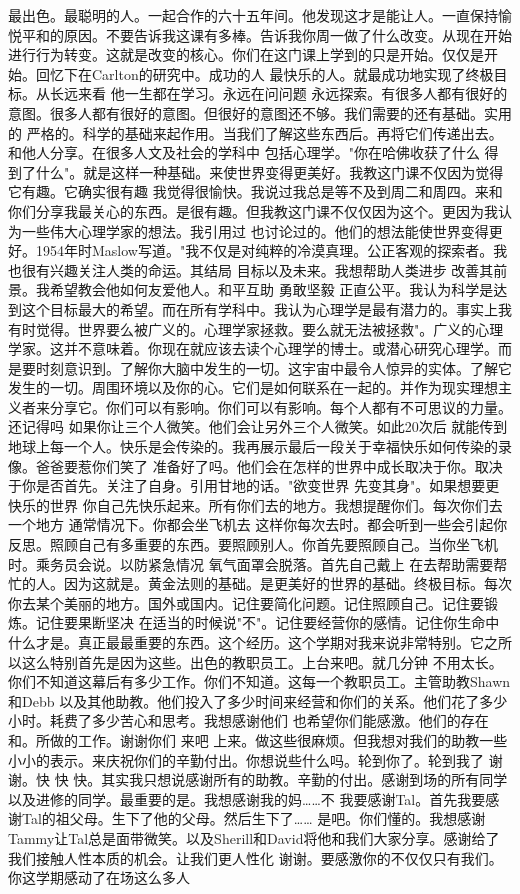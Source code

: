 最出色。最聪明的人。一起合作的六十五年间。他发现这才是能让人。一直保持愉悦平和的原因。不要告诉我这课有多棒。告诉我你周一做了什么改变。从现在开始进行行为转变。这就是改变的核心。你们在这门课上学到的只是开始。仅仅是开始。回忆下在Carlton的研究中。成功的人 最快乐的人。就最成功地实现了终极目标。从长远来看 他一生都在学习。永远在问问题 永远探索。有很多人都有很好的意图。很多人都有很好的意图。但很好的意图还不够。我们需要的还有基础。实用的 严格的。科学的基础来起作用。当我们了解这些东西后。再将它们传递出去。和他人分享。在很多人文及社会的学科中 包括心理学。"你在哈佛收获了什么 得到了什么"。就是这样一种基础。来使世界变得更美好。我教这门课不仅因为觉得它有趣。它确实很有趣 我觉得很愉快。我说过我总是等不及到周二和周四。来和你们分享我最关心的东西。是很有趣。但我教这门课不仅仅因为这个。更因为我认为一些伟大心理学家的想法。我引用过 也讨论过的。他们的想法能使世界变得更好。1954年时Maslow写道。"我不仅是对纯粹的冷漠真理。公正客观的探索者。我也很有兴趣关注人类的命运。其结局 目标以及未来。我想帮助人类进步 改善其前景。我希望教会他如何友爱他人。和平互助 勇敢坚毅 正直公平。我认为科学是达到这个目标最大的希望。而在所有学科中。我认为心理学是最有潜力的。事实上我有时觉得。世界要么被广义的。心理学家拯救。要么就无法被拯救"。广义的心理学家。这并不意味着。你现在就应该去读个心理学的博士。或潜心研究心理学。而是要时刻意识到。了解你大脑中发生的一切。这宇宙中最令人惊异的实体。了解它发生的一切。周围环境以及你的心。它们是如何联系在一起的。并作为现实理想主义者来分享它。你们可以有影响。你们可以有影响。每个人都有不可思议的力量。还记得吗 如果你让三个人微笑。他们会让另外三个人微笑。如此20次后 就能传到地球上每一个人。快乐是会传染的。我再展示最后一段关于幸福快乐如何传染的录像。爸爸要惹你们笑了 准备好了吗。他们会在怎样的世界中成长取决于你。取决于你是否首先。关注了自身。引用甘地的话。"欲变世界 先变其身"。如果想要更快乐的世界 你自己先快乐起来。所有你们去的地方。我想提醒你们。每次你们去一个地方 通常情况下。你都会坐飞机去 这样你每次去时。都会听到一些会引起你反思。照顾自己有多重要的东西。要照顾别人。你首先要照顾自己。当你坐飞机时。乘务员会说。以防紧急情况 氧气面罩会脱落。首先自己戴上 在去帮助需要帮忙的人。因为这就是。黄金法则的基础。是更美好的世界的基础。终极目标。每次你去某个美丽的地方。国外或国内。记住要简化问题。记住照顾自己。记住要锻炼。记住要果断坚决 在适当的时候说"不"。记住要经营你的感情。记住你生命中什么才是。真正最最重要的东西。这个经历。这个学期对我来说非常特别。它之所以这么特别首先是因为这些。出色的教职员工。上台来吧。就几分钟 不用太长。你们不知道这幕后有多少工作。你们不知道。这每一个教职员工。主管助教Shawn和Debb 以及其他助教。他们投入了多少时间来经营和你们的关系。他们花了多少小时。耗费了多少苦心和思考。我想感谢他们 也希望你们能感激。他们的存在和。所做的工作。谢谢你们 来吧 上来。做这些很麻烦。但我想对我们的助教一些小小的表示。来庆祝你们的辛勤付出。你想说些什么吗。轮到你了。轮到我了 谢谢。快 快 快。其实我只想说感谢所有的助教。辛勤的付出。感谢到场的所有同学 以及进修的同学。最重要的是。我想感谢我的妈……不 我要感谢Tal。首先我要感谢Tal的祖父母。生下了他的父母。然后生下了…… 是吧。你们懂的。我想感谢Tammy让Tal总是面带微笑。以及Sherill和David将他和我们大家分享。感谢给了我们接触人性本质的机会。让我们更人性化 谢谢。要感激你的不仅仅只有我们。你这学期感动了在场这么多人 